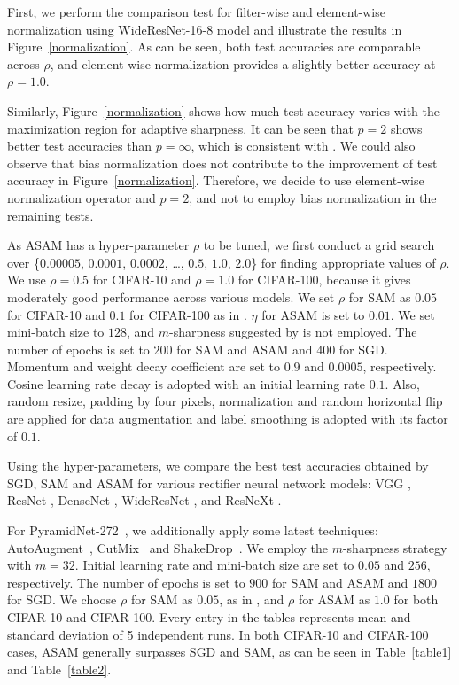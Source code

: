 \documentclass{article}
\begin{document}
First, we perform the comparison test for filter-wise and element-wise normalization using WideResNet-16-8 model \citep{zagoruyko2016wide} and illustrate the results in Figure~\ref{normalization}. As can be seen, both test accuracies are comparable across $\rho$, and element-wise normalization provides a slightly better accuracy at $\rho=1.0$. 

Similarly, Figure~\ref{normalization} shows how much test accuracy varies with the maximization region for adaptive sharpness. It can be seen that $p=2$ shows better test accuracies than $p=\infty$, which is consistent with \citet{foret2021sharpnessaware}. We could also observe that bias normalization does not contribute to the improvement of test accuracy in Figure~\ref{normalization}. Therefore, we decide to use element-wise normalization operator and $p=2$, and not to employ bias normalization in the remaining tests.

As ASAM has a hyper-parameter $\rho$ to be tuned, we first conduct a grid search over \{$0.00005$, $0.0001$, $0.0002$, \ldots, $0.5$, $1.0$, $2.0$\} for finding appropriate values of $\rho$. We use $\rho=0.5$ for CIFAR-10 and $\rho=1.0$ for CIFAR-100, because it gives moderately good performance across various models. We set $\rho$ for SAM as $0.05$ for CIFAR-10 and $0.1$ for CIFAR-100 as in \citet{foret2021sharpnessaware}. $\eta$ for ASAM is set to $0.01$. 
We set mini-batch size to $128$, and $m$-sharpness suggested by \citet{foret2021sharpnessaware} is not employed. The number of epochs is set to $200$ for SAM and ASAM and $400$ for SGD. Momentum and weight decay coefficient are set to $0.9$ and $0.0005$, respectively. 
Cosine learning rate decay \citep{loshchilov2016sgdr} is adopted with an initial learning rate $0.1$. Also, random resize, padding by four pixels, normalization and random horizontal flip are applied for data augmentation and label smoothing \citep{NEURIPS2019_f1748d6b} is adopted with its factor of $0.1$.

Using the hyper-parameters, we compare the best test accuracies obtained by SGD, SAM and ASAM for various rectifier neural network models: VGG \citep{simonyan2014very}, ResNet \citep{he2016deep}, DenseNet \citep{huang2017densely}, WideResNet \citep{zagoruyko2016wide}, and ResNeXt \citep{xie2017aggregated}. 



For PyramidNet-272~\citep{han2017deep}, we additionally apply some latest techniques: AutoAugment~\citep{cubuk2019autoaugment}, CutMix~\citep{yun2019cutmix} and ShakeDrop~\citep{yamada2019shakedrop}. We employ the $m$-sharpness strategy with $m=32$. Initial learning rate and mini-batch size are set to $0.05$ and $256$, respectively. The number of epochs is set to $900$ for SAM and ASAM and $1800$ for SGD. We choose $\rho$ for SAM as $0.05$, as in \citet{foret2021sharpnessaware}, and $\rho$ for ASAM as $1.0$ for both CIFAR-10 and CIFAR-100. Every entry in the tables represents mean and standard deviation of 5 independent runs. In both CIFAR-10 and CIFAR-100 cases, ASAM generally surpasses SGD and SAM, as can be seen in Table~\ref{table1} and Table~\ref{table2}.
\end{document}
